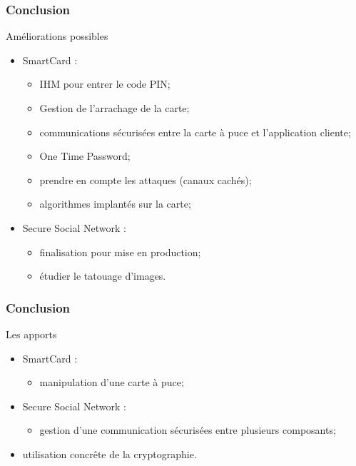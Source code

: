 \documentclass{beamer}
\begin{document}
\begin{frame}
\frametitle{Conclusion}
\begin{block}{Améliorations possibles}
\begin{itemize}
    \item SmartCard : 
    \begin{itemize}
        \item IHM pour entrer le code PIN; %
        \item Gestion de l'arrachage de la carte; %
        \item communications sécurisées entre la carte à puce et l'application
            cliente;
        \item One Time Password;
        \item prendre en compte les attaques (canaux cachés);
        \item algorithmes implantés sur la carte;
    \end{itemize}
    \item Secure Social Network : 
        \begin{itemize}
           \item finalisation pour mise en production;
           \item étudier le tatouage d'images.
        \end{itemize}
\end{itemize}
\end{block}
\end{frame}

\begin{frame}
\frametitle{Conclusion}
\begin{block}{Les apports}
\begin{itemize}
    \item SmartCard : 
    \begin{itemize}
        \item manipulation d'une carte à puce;
    \end{itemize}
    \item Secure Social Network : 
        \begin{itemize}
           \item gestion d'une communication sécurisées entre plusieurs
            composants;
        \end{itemize}
    \item utilisation concrête de la cryptographie.
\end{itemize}
\end{block}
\end{frame}
\end{document}
